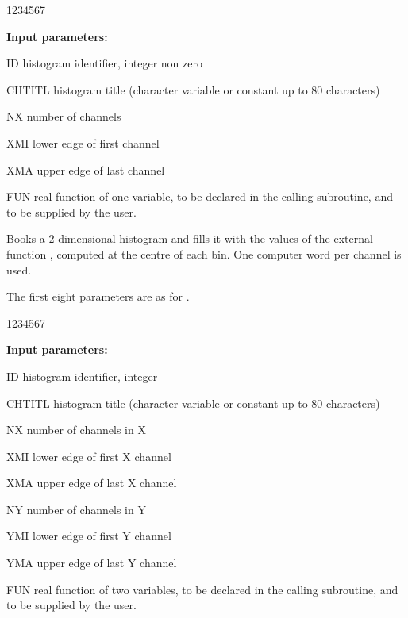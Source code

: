 \newpage 
\begin{DLttc}{1234567}
\item[{\rm\bf Input parameters:}]
\item[ID] histogram identifier, integer non zero
\item[CHTITL] histogram title (character variable or constant up to 80
              characters)
\item[NX] number of channels
\item[XMI] lower edge of first channel
\item[XMA] upper edge of last channel
\item[FUN] real function of one variable, to be declared
            in the calling subroutine, and to be
           supplied by the user.
\end{DLttc}
 

\Action Books a 2-dimensional
histogram and fills it with the values of the external
function , computed at the centre of each bin.
One computer word per channel is used.
 
The first eight parameters are as for .

\begin{DLttc}{1234567}
\item[{\rm\bf Input parameters:}]
\item[ID] histogram identifier, integer
\item[CHTITL] histogram title  (character variable or constant up to 80
          characters)
\item[NX] number of channels in X
\item[XMI] lower edge of first X channel
\item[XMA] upper edge of last X channel
\item[NY] number of channels in Y
\item[YMI] lower edge of first Y channel
\item[YMA] upper edge of last Y channel
\item[FUN] real function of two variables, to be declared
 in the calling subroutine, and to be supplied by the user.
\end{DLttc}


